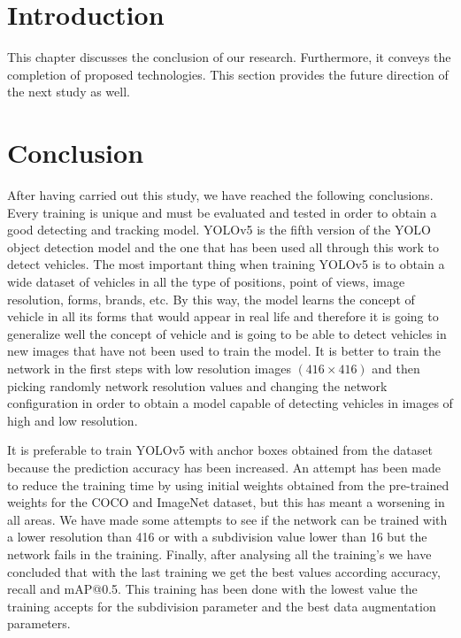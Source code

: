 \section{Introduction}
This chapter discusses the conclusion of our research. Furthermore, it conveys the completion of proposed technologies. This section provides the future direction of the next study as well.

\section{Conclusion}

After having carried out this study, we have reached the following conclusions. Every training is 
unique  and  must  be  evaluated  and  tested  in  order  to  obtain  a  good  detecting  and  tracking 
model. YOLOv5 is the fifth version of the  YOLO object  detection model and the  one  that has 
been  used  all  through  this  work  to  detect  vehicles.  The  most  important  thing  when  training 
YOLOv5 is to obtain a wide dataset of vehicles in all the type of positions, point of views, image 
resolution, forms, brands, etc. By this way, the model learns the concept of vehicle in all its forms 
that would appear in real life and therefore it is going to generalize well the concept of vehicle 
and is going to be able to detect vehicles  in new  images  that  have not  been used to train the 
model. It is better to train the network in the first steps with low resolution images $(416 \times 416)$ 
and then picking randomly network resolution values and changing the network configuration 
in order to obtain a model capable of detecting vehicles in images of high and low resolution. 



It  is  preferable  to  train  YOLOv5  with  anchor  boxes  obtained  from  the  dataset  because  the 
prediction accuracy has been increased. An attempt has been made to reduce the training time 
by  using  initial  weights  obtained  from  the  pre-trained  weights  for  the  COCO  and  ImageNet 
dataset, but this has meant a worsening in all areas. We have made some attempts to see if the 
network can be trained with a lower resolution than 416 or with a subdivision value lower than 
16  but  the  network  fails  in  the  training.  Finally,  after  analysing  all  the  training's  we  have 
concluded  that  with  the  last  training  we  get  the  best  values  according  accuracy,  recall  and 
mAP@0.5.  This  training  has  been  done  with  the  lowest  value  the  training  accepts  for  the 
subdivision parameter and the best data augmentation parameters. 



